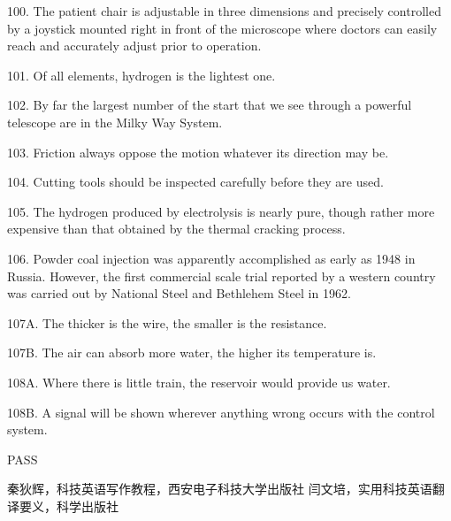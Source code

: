 \documentclass[a4paper,twocolumn,10pt]{article}
\begin{document}
\begin{CJK}{UTF8}{gkai}
100. The patient chair is adjustable in three dimensions and precisely
controlled by a joystick mounted right in front of the microscope where
doctors can easily reach and accurately adjust prior to operation.

101. Of all elements, hydrogen is the lightest one.

102. By far the largest number of the start that we see through
a powerful telescope are in the Milky Way System.

103. Friction always oppose the motion whatever its direction may be.

104. Cutting tools should be inspected carefully before they
are used.

105. The hydrogen produced by electrolysis is nearly pure,
though rather more expensive than that obtained by the thermal cracking process.

106. Powder coal injection was apparently accomplished as early as 1948 in Russia.
However, the first commercial scale trial reported by a western country
was carried out by National Steel and Bethlehem Steel in 1962.

107A. The thicker is the wire, the smaller is the resistance.

107B. The air can absorb more water, the higher its temperature is.

108A. Where there is little train, the reservoir would provide us water.

108B. A signal will be shown wherever anything wrong occurs with the control system.

PASS

\appendix
\begin{thebibliography}{9}
		秦狄辉，科技英语写作教程，西安电子科技大学出版社
		闫文培，实用科技英语翻译要义，科学出版社

\end{thebibliography}

\end{CJK}
\end{document}
